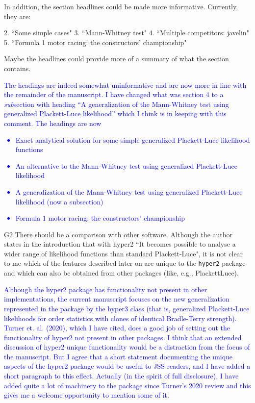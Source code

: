 \documentclass[12pt]{article}
\begin{document}
In addition, the section headlines could be made more
informative. Currently, they are:

2. ``Some simple cases"
3. ``Mann-Whitney test"
4. ``Multiple competitors: javelin"
5. ``Formula 1 motor racing: the constructors' championship"



Maybe the headlines could provide more of a summary of what the
section contains.  \textcolor{blue}{The headings are indeed somewhat
  uninformative and are now more in line with the remainder of the
  manuscript.  I have changed what was section 4 to a {\em sub}section
  with heading ``A generalization of the Mann-Whitney test using
  generalized Plackett-Luce likelihood'' which I think is in keeping
  with this comment.  The headings are now
  \begin{itemize}
  \item Exact analytical solution for some simple generalized
    Plackett-Luce likelihood functions
  \item An alternative to the Mann-Whitney test using generalized
    Plackett-Luce likelihood
  \item A generalization of the Mann-Whitney test using
    generalized Plackett-Luce likelihood (now a subsection)
  \item Formula 1 motor racing: the constructors' championship
\end{itemize}}
\rule{0mm}{10mm}

G2 There should be a comparison with other software.  Although the
author states in the introduction that with hyper2 ``It becomes
possible to analyse a wider range of likelihood functions than
standard Plackett-Luce", it is not clear to me which of the features
described later on are unique to the \verb+hyper2+ package and which
can also be obtained from other packages (like, e.g., PlackettLuce).

\textcolor{blue}{Although the hyper2 package has functionality not
  present in other implementations, the current manuscript focuses on
  the new generalization represented in the package by the hyper3
  class (that is, generalized Plackett-Luce likelihoods for order
  statistics with clones of identical Bradle-Terry strength).  Turner
  et. al. (2020), which I have cited, does a good job of setting out
  the functionality of hyper2 not present in other packages.  I think
  that an extended discussion of hyper2 unique functionality would be
  a distraction from the focus of the manuscript.  But I agree that a
  short statement documenting the unique aspects of the hyper2 package
  would be useful to JSS readers, and I have added a short paragraph
  to this effect.  Actually (in the spirit of full disclosure), I have
  added quite a lot of machinery to the package since Turner's 2020
  review and this gives me a welcome opportunity to mention some of
  it.}
\end{document}

